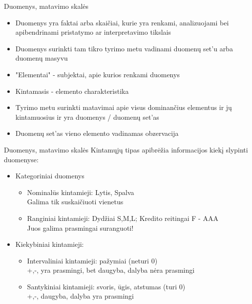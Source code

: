 \documentclass[11pt,xcolor=table]{beamer}
\begin{document}
\begin{frame}{Duomenys, matavimo skalės}
\begin{itemize}
\item Duomenys yra faktai arba skaičiai, kurie yra renkami, analizuojami bei apibendrinami pristatymo ar interpretavimo tikslais
\item Duomenys surinkti tam tikro tyrimo metu vadinami duomenų set'u arba duomenų masyvu
\item "Elementai" - subjektai, apie kurios renkami duomenys
\item Kintamasis - elemento charakteristika
\item Tyrimo metu surinkti matavimai apie visus dominančius elementus ir jų kintamuosius ir yra duomenys / duomenų set'as
\item Duomenų set'as vieno elemento vadinamas obzervacija
\end{itemize}
\end{frame}


\begin{frame}{Duomenys, matavimo skalės}
Kintamųjų tipas apibrėžia informacijos kiekį slypinti duomenyse:
\begin{itemize}
\item Kategoriniai duomenys
\begin{itemize}
\item Nominalūs kintamieji: Lytis, Spalva
\\ Galima tik suskaičiuoti vienetus
\item Ranginiai kintamieji: Dydžiai S,M,L; Kredito reitingai F - AAA 
\\ Juos galima prasmingai suranguoti!
\end{itemize}
\item Kiekybiniai kintamieji:
\begin{itemize}
\item Intervaliniai kintamieji: pažymiai (neturi 0)
\\ +,-, yra prasmingi, bet daugyba, dalyba nėra prasmingi
\item Santykiniai kintamieji: svoris, ūgis, atstumas  (turi 0)
\\ +,-, daugyba, dalyba yra prasmingi
\end{itemize}
\end{itemize}
\end{frame}

\end{document}
